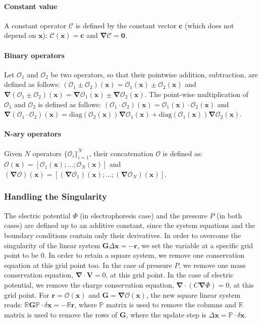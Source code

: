 \documentclass[preprint,10pt]{elsarticle}
\newcommand{\diag}{\ensuremath{\mathrm{diag}}}
\newcommand{\pars}[1]{\left(#1\right)}
\newcommand\bnabla{\boldsymbol{\nabla}}
\newcommand\bV{\boldsymbol{V}}
\newcommand\bG{\boldsymbol{G}}
\newcommand\bx{\boldsymbol{x}}
\newcommand\br{\boldsymbol{r}}
\newcommand\bc{\boldsymbol{c}}
\newcommand\bzero{\boldsymbol{0}}
\newcommand\cO{\mathcal{O}}
\begin{document}
\paragraph{Constant value}
A constant operator $\mathcal{C}$ is defined by the constant vector $\bc$ 
(which does not depend on $\bx$):
$\mathcal{C}(\bx) = \bc$ and $\bnabla\mathcal{C} = \bzero$.

\paragraph{Binary operators}
Let $\cO_1$ and $\cO_2$ be two operators, so that their pointwise addition, subtraction,
are defined as follows:
$(\cO_1 \pm \cO_2)(\bx) = \cO_1(\bx) \pm \cO_2(\bx)$ and
$\bnabla (\cO_1 \pm \cO_2)(\bx) = \bnabla\cO_1(\bx) \pm \bnabla\cO_2(\bx)$.
The point-wise multiplication of $\cO_1$ and $\cO_2$ is defined as follows: 
$(\cO_1 \cdot \cO_2)(\bx) = \cO_1(\bx) \cdot \cO_2(\bx)$ and 
$\bnabla (\cO_1 \cdot \cO_2)(\bx) = \diag(\cO_2(\bx)) \bnabla\cO_1(\bx)
                                  + \diag(\cO_1(\bx)) \bnabla\cO_2(\bx)$.

\paragraph{N-ary operators}
Given $N$ operators $\{\cO_i\}_{i=1}^N$, their concatenation $\cO$ is defined as:
$\cO(\bx) = [\cO_1(\bx); \ldots; \cO_N(\bx)]$ and  
$(\bnabla\cO)(\bx) = [(\bnabla\cO_1)(\bx); \ldots; (\bnabla\cO_N)(\bx)]$.

\subsubsection{Handling the Singularity} \label{sec:singular}
The electric potential $\varPhi$ (in electrophoresis case) and the pressure $P$ (in both cases) 
are defined up to an additive constant, since the system equations and the boundary conditions
contain only their derivatives.
In order to overcome the singularity of the linear system 
$\bG \Delta\bx = -\br$, we set the variable at 
a specific grid point to be $0$.
In order to retain a square system, we remove one conservation equation at this grid point too.
In the case of pressure $P$, we remove one mass conservation equation,
$\bnabla \cdot \bV = 0$, at this grid point. 
In the case of electric potential, we remove the charge conservation
equation, $\bnabla \cdot \pars{C \bnabla \varPhi} = 0$, at this grid point.
For $\br = \cO(\bx)$ and $\bG = \bnabla \cO(\bx)$, the new square linear system reads:
$\mathbb{R} \bG \mathbb{P} \cdot \delta\bx = -\mathbb{R} \br$,
where $\mathbb{P}$ matrix is used to remove the columns
and $\mathbb{R}$ matrix is used to remove the rows of $\bG$,
where the update step is $\Delta \bx = \mathbb{P} \cdot \delta \bx$.
\end{document}
